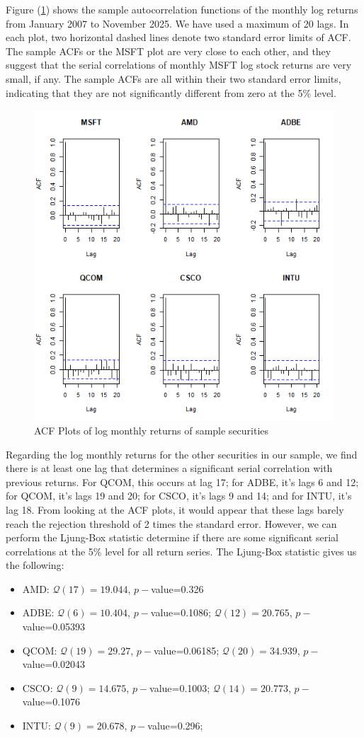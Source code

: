 \documentclass[12pt]{article}
\begin{document}
Figure (\ref{fig:acf_plot}) shows the sample autocorrelation functions of the monthly log returns from January 2007 to November 2025. We have used a maximum of 20 lags. In each plot, two horizontal dashed lines denote two standard error limits of ACF. The sample ACFs or the MSFT plot are very close to each other, and they suggest that the serial correlations of monthly MSFT log stock returns are very small, if any. The sample ACFs are all within their two standard error limits, indicating that they are not significantly different from zero at the 5\% level.
\begin{figure}[h]
	\centering
	\includegraphics[width=0.7\linewidth]{plots/acf_monthly_returns.png}
	\caption{ACF Plots of log monthly returns of sample securities}
	\label{fig:acf_plot}
\end{figure}
Regarding the log monthly returns for the other securities in our sample, we find there is at least one lag that determines a significant serial correlation with previous returns. For QCOM, this occurs at lag 17; for ADBE, it's lags 6 and 12; for QCOM, it's lags 19 and 20; for CSCO, it's lags 9 and 14; and for INTU, it's lag 18. From looking at the ACF plots, it would appear that these lags barely reach the rejection threshold of 2 times the standard error. However, we can perform the Ljung-Box statistic determine if there are some significant serial correlations at the 5\% level for all return series. The Ljung-Box statistic gives us the following:
\begin{itemize}
	\item AMD: $\mathcal{Q}(17)=19.044$, $p-$value=0.326
	\item ADBE: $\mathcal{Q}(6)=10.404$, $p-$value=0.1086; $\mathcal{Q}(12)=20.765$, $p-$value=0.05393
	\item QCOM: $\mathcal{Q}(19)=29.27$, $p-$value=0.06185; $\mathcal{Q}(20)=34.939$, $p-$value=0.02043
	\item CSCO: $\mathcal{Q}(9)=14.675$, $p-$value=0.1003; $\mathcal{Q}(14)=20.773$, $p-$value=0.1076
	\item INTU: $\mathcal{Q}(9)=20.678$, $p-$value=0.296;
\end{itemize}
\end{document}
